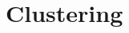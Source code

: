 \documentclass[12pt,letterpaper]{report}
\begin{document}
\sloppy





\tableofcontents
\listoffigures



\chapter{Clustering}
\label{cluster}

%


%
%
\end{document}
